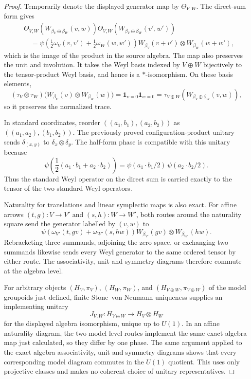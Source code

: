 \begin{proof}
Temporarily denote the displayed generator map by $\Theta_{V,W}$.  The
direct-sum form gives
\begin{align*}
 &\Theta_{V,W}(W_{\beta_V\oplus\beta_W}(v,w))
  \Theta_{V,W}(W_{\beta_V\oplus\beta_W}(v',w')) \\
 &\quad=
 \psi\!\left(\frac12\omega_V(v,v')+\frac12\omega_W(w,w')\right)
 W_{\beta_V}(v+v')\otimes W_{\beta_W}(w+w'),
\end{align*}
which is the image of the product in the source algebra.  The map also
preserves the unit and involution.  It takes the Weyl basis indexed by
$V\oplus W$ bijectively to the tensor-product Weyl basis, and hence is a
$*$-isomorphism.  On these basis elements,
\[
 (\tau_V\otimes\tau_W)
 \bigl(W_{\beta_V}(v)\otimes W_{\beta_W}(w)\bigr)
 =\mathbf 1_{v=0}\mathbf 1_{w=0}
 =\tau_{V\oplus W}(W_{\beta_V\oplus\beta_W}(v,w)),
\]
so it preserves the normalized trace.

In standard coordinates, reorder
$((a_1,b_1),(a_2,b_2))$ as
$((a_1,a_2),(b_1,b_2))$.  The previously proved configuration-product
unitary sends $\delta_{(x,y)}$ to $\delta_x\otimes\delta_y$.  The half-form
phase is compatible with this unitary because
\[
 \psi\!\left(\frac12(a_1\mathbin{\cdot}b_1
                         +a_2\mathbin{\cdot}b_2)\right)
 =\psi(a_1\mathbin{\cdot}b_1/2)\,
  \psi(a_2\mathbin{\cdot}b_2/2).
\]
Thus the standard Weyl operator on the direct sum is carried exactly to the
tensor of the two standard Weyl operators.

Naturality for translations and linear symplectic maps is also exact.  For
affine arrows $(t,g):V\to V'$ and $(s,h):W\to W'$, both routes around the
naturality square send the generator labelled by $(v,w)$ to
\[
 \psi\!\left(\omega_{V'}(t,gv)+\omega_{W'}(s,hw)\right)
 W_{\beta_{V'}}(gv)\otimes W_{\beta_{W'}}(hw).
\]
Rebracketing three summands, adjoining the zero space, or exchanging two
summands likewise sends every Weyl generator to the same ordered tensor by
either route.  The associativity, unit and symmetry diagrams therefore
commute at the algebra level.

For arbitrary objects $(H_V,\pi_V)$, $(H_W,\pi_W)$, and
$(H_{V\oplus W},\pi_{V\oplus W})$ of the model groupoids just defined,
finite Stone--von Neumann uniqueness supplies an implementing unitary
\[
 J_{V,W}:H_{V\oplus W}\longrightarrow H_V\otimes H_W
\]
for the displayed algebra isomorphism, unique up to $U(1)$.  In an affine
naturality diagram, the two model-level routes implement the same exact
algebra map just calculated, so they differ by one phase.  The same argument
applied to the exact algebra associativity, unit and symmetry diagrams shows
that every corresponding model diagram commutes in the $U(1)$ quotient.
This uses only projective classes and makes no coherent choice of unitary
representatives.
\end{proof}

